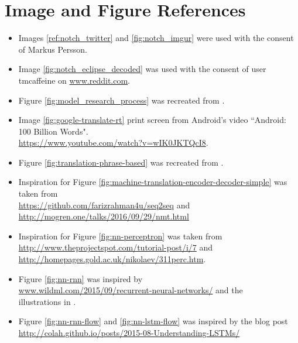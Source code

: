 
\chapter{Image and Figure References}


\begin{itemize}
    \item Images \ref{ref:notch_twitter} and \ref{fig:notch_imgur} were used with the consent of Markus Persson.
    \item Image \ref{fig:notch_eclipse_decoded} was used with the consent of user tmcaffeine on \url{www.reddit.com}.
    \item Figure \ref{fig:model_research_process} was recreated from \citep{oates2005researching}.
    \item Image \ref{fig:google-translate-rt} print screen from Android's video ``Android: 100 Billion Words".\\ \url{https://www.youtube.com/watch?v=wIK0JKTQcI8}.
    \item Figure \ref{fig:translation-phrase-based} was recreated from \citep{koehn2010statistical}.
    \item Inspiration for Figure \ref{fig:machine-translation-encoder-decoder-simple} was taken from \\ \url{https://github.com/farizrahman4u/seq2seq} and\\\url{http://mogren.one/talks/2016/09/29/nmt.html}
    \item Inspiration for Figure \ref{fig:nn-perceptron} was taken from\\\url{http://www.theprojectspot.com/tutorial-post/i/7} and \\ \url{http://homepages.gold.ac.uk/nikolaev/311perc.htm}.
    \item Figure \ref{fig:nn-rnn} was inspired by \\ \url{www.wildml.com/2015/09/recurrent-neural-networks/} and the\\ illustrations in \citep{goodfellow2016deeplearning}.
    \item Figure \ref{fig:nn-rnn-flow} and \ref{fig:nn-lstm-flow} was inspired by the blog post \\ \url{http://colah.github.io/posts/2015-08-Understanding-LSTMs/}
\end{itemize}